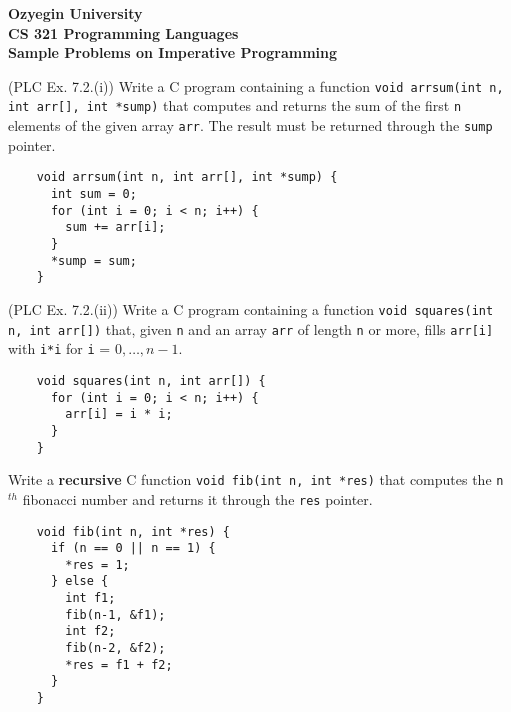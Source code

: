 \documentclass[addpoints]{exam}
\begin{document}
\begin{center}
{\Large \textbf{
    Ozyegin University\\
    CS 321 Programming Languages\\
    Sample Problems on Imperative Programming
}}
\end{center}

\begin{questions}
  \question
  (PLC Ex. 7.2.(i))
  Write a C program containing a function
  \texttt{void arrsum(int n, int arr[], int *sump)}
  that computes and returns the sum of the first
  \texttt{n} elements of the given array \texttt{arr}.
  The result must be returned through the \texttt{sump} pointer.

  \begin{solutionbox}{4cm}
  \begin{verbatim}
    void arrsum(int n, int arr[], int *sump) {
      int sum = 0;
      for (int i = 0; i < n; i++) {
        sum += arr[i];
      }
      *sump = sum;
    }
  \end{verbatim}
  \end{solutionbox}

  \question
  (PLC Ex. 7.2.(ii))
  Write a C program containing a function
  \texttt{void squares(int n, int arr[])} that,
  given \texttt{n} and an array \texttt{arr} of
  length \texttt{n} or more, fills \texttt{arr[i]}
  with \texttt{i*i} for \texttt{i} = $0,\ldots,n-1$.

  \begin{solutionbox}{3.5cm}
  \begin{verbatim}
    void squares(int n, int arr[]) {
      for (int i = 0; i < n; i++) {
        arr[i] = i * i;
      }
    }
  \end{verbatim}
  \end{solutionbox}

  \question
  Write a \textbf{recursive} C function 
  \texttt{void fib(int n, int *res)}
  that computes the \texttt{n}$^{th}$ fibonacci number
  and returns it through the
  \texttt{res} pointer.

  \begin{solutionbox}{6cm}
  \begin{verbatim}
    void fib(int n, int *res) {
      if (n == 0 || n == 1) {
        *res = 1;
      } else {
        int f1;
        fib(n-1, &f1);
        int f2;
        fib(n-2, &f2);
        *res = f1 + f2;
      }
    }
  \end{verbatim}
  \end{solutionbox}


\end{questions}
\end{document}
